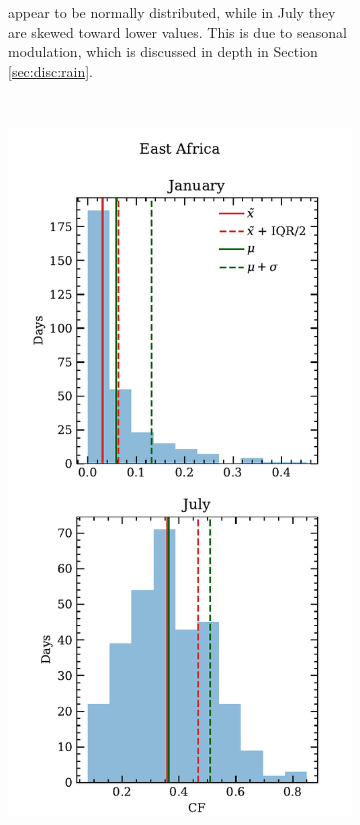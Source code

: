 \begin{figure}
\begin{subfigure}{0.45\textwidth}
{      appear to be normally distributed, while in July they are skewed
      toward lower values. This is due to seasonal modulation, which
      is discussed in depth in Section \ref{sec:disc:rain}.}
    \label{fig:cf_dist_south}
  \end{subfigure}
  ~
  \begin{subfigure}{0.45\textwidth}
    \centering
    \includegraphics[width=\textwidth]{figures/cf_monthly_dist_eastafrica}

\end{subfigure}
\end{figure}

